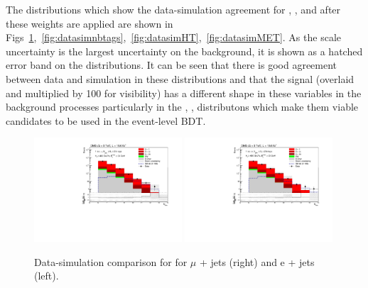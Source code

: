 The distributions which show the data-simulation agreement for \njets, \nbtags, \HT and \MET after these weights are applied are shown in Figs~\ref{fig:datasimnjets},~\ref{fig:datasimnbtags},~\ref{fig:datasimHT},~\ref{fig:datasimMET}. As the scale uncertainty is the largest uncertainty on the background, it is shown as a hatched error band on the distributions. It can be seen that there is good agreement between data and simulation in these distributions and that the signal (overlaid and multiplied by 100 for visibility) has a different shape in these variables in the background processes particularly in the \njets, \nbtags, \HT distributons which make them viable candidates to be used in the event-level BDT.


\begin{figure}[ht!]
\centering
    \includegraphics[width=0.49\textwidth]{images/Run1/NbOfSelectedJets_mu.pdf}
     \includegraphics[width=0.49\textwidth]{images/Run1/NbOfSelectedJets_e.pdf}       
    \caption{Data-simulation comparison for \njets for $\mu$ + jets (right) and e + jets (left).}
    \label{fig:datasimnjets}
\end{figure}

